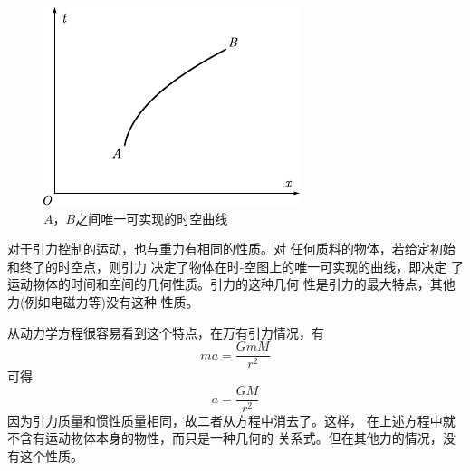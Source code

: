 \begin{figure}
	\centering
	\includegraphics{figure/fig04.08}
	\caption{$ A $，$ B $之间唯一可实现的时空曲线}
	\label{fig:04.08}
\end{figure}
对于引力控制的运动，也与重力有相同的性质。对
任何质料的物体，若给定初始和终了的时空点，则引力
决定了物体在时-空图上的唯一可实现的曲线，即决定
了运动物体的时间和空间的几何性质。引力的这种几何
性是引力的最大特点，其他力(例如电磁力等)没有这种
性质。

从动力学方程很容易看到这个特点，在万有引力情况，有
\begin{equation*}
	m a = \frac { G m M } { r ^ { 2 } }  
\end{equation*}
可得\vspace{-1em}
\begin{equation*}
	a = \frac { G M } { r ^ { 2 } } 
\end{equation*}
因为引力质量和惯性质量相同，故二者从方程中消去了。这样，
在上述方程中就不含有运动物体本身的物性，而只是一种几何的
关系式。但在其他力的情况，没有这个性质。
